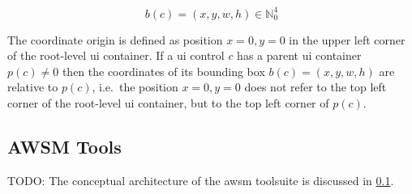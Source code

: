 \begin{equation}b(c) = (x,y,w,h) \in \mathbb{N}_0^4\label{eq:bounding-box}\end{equation}

The coordinate origin is defined as position \(x=0, y=0\) in the upper left corner of the root-level \gls{ui} container.
If a \gls{ui} control \(c\) has a parent \gls{ui} container \(p(c) \neq 0\) then the coordinates of its bounding box \(b(c) = (x,y,w,h)\) are relative to \(p(c)\), i.e.~the position \(x=0, y=0\) does not refer to the top left corner of the root-level \gls{ui} container, but to the top left corner of \(p(c)\).



%




\hypertarget{sec:platform}{%
\subsection{AWSM Tools}\label{sec:platform}}

TODO: The conceptual architecture of the \gls{awsm} toolsuite is discussed in \cref{sec:platform}.

